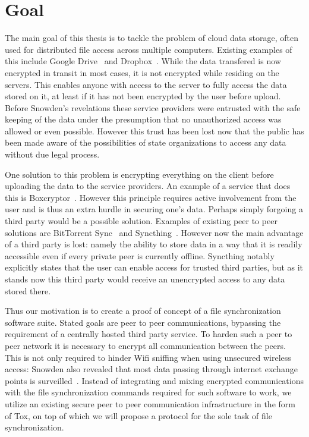 \section{Goal}
\label{sec:Goal}

The main goal of this thesis is to tackle the problem of cloud data storage, often used for distributed file access across multiple computers.
Existing examples of this include Google Drive~\cite{web:site:gdrive} and Dropbox~\cite{web:site:dropbox}.
While the data transfered is now encrypted in transit in most cases, it is not encrypted while residing on the servers.
This enables anyone with access to the server to fully access the data stored on it, at least if it has not been encrypted by the user before upload.
Before Snowden's revelations these service providers were entrusted with the safe keeping of the data under the presumption that no unauthorized access was allowed or even possible.
However this trust has been lost now that the public has been made aware of the possibilities of state organizations to access any data without due legal process.

One solution to this problem is encrypting everything on the client before uploading the data to the service providers.
An example of a service that does this is Boxcryptor~\cite{web:site:boxcryptor}.
However this principle requires active involvement from the user and is thus an extra hurdle in securing one's data.
Perhaps simply forgoing a third party would be a possible solution.
Examples of existing peer to peer solutions are BitTorrent Sync~\cite{web:site:bittorrent_sync} and Syncthing~\cite{web:site:synthing}.
However now the main advantage of a third party is lost: namely the ability to store data in a way that it is readily accessible even if every private peer is currently offline.
Syncthing notably explicitly states that the user can enable access for trusted third parties, but as it stands now this third party would receive an unencrypted access to any data stored there.

Thus our motivation is to create a proof of concept of a file synchronization software suite.
Stated goals are peer to peer communications, bypassing the requirement of a centrally hosted third party service.
To harden such a peer to peer network it is necessary to encrypt all communication between the peers.
This is not only required to hinder Wifi sniffing when using unsecured wireless access: Snowden also revealed that most data passing through internet exchange points is surveilled~\cite{web:site:heise:decix}.
Instead of integrating and mixing encrypted communications with the file synchronization commands required for such software to work, we utilize an existing secure peer to peer communication infrastructure in the form of Tox, on top of which we will propose a protocol for the sole task of file synchronization.

